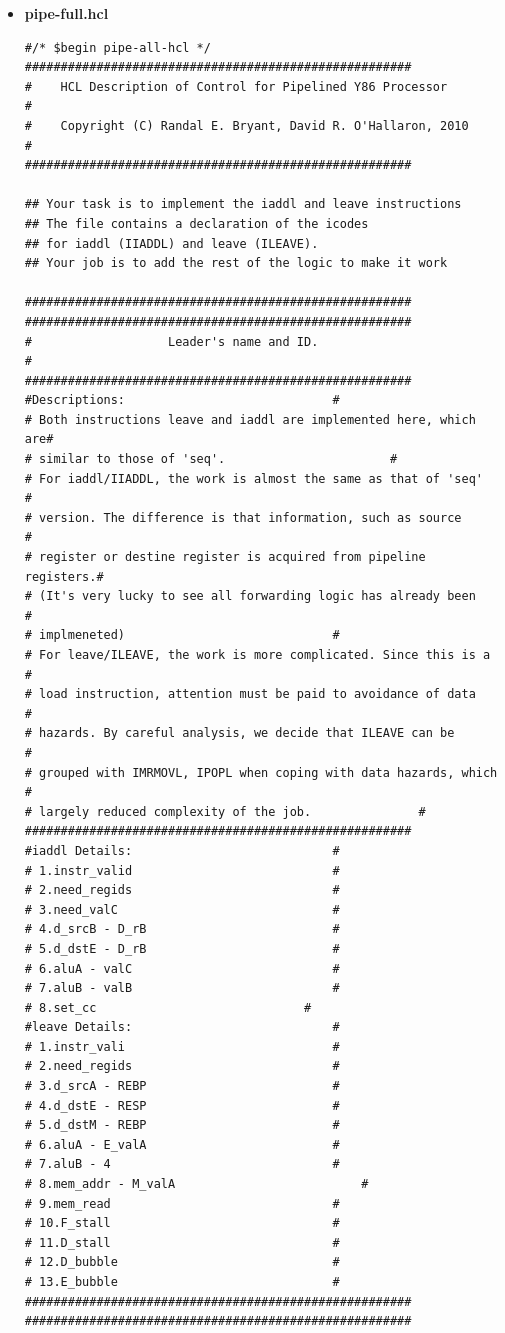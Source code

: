 \documentclass{article}
\begin{document}
\begin{itemize}
\begin{lstlisting}[caption={}]
   \end{lstlisting}


\item \textbf{pipe-full.hcl}
  \begin{lstlisting}[caption={}]
#/* $begin pipe-all-hcl */
######################################################
#    HCL Description of Control for Pipelined Y86 Processor        #
#    Copyright (C) Randal E. Bryant, David R. O'Hallaron, 2010     #
######################################################

## Your task is to implement the iaddl and leave instructions
## The file contains a declaration of the icodes
## for iaddl (IIADDL) and leave (ILEAVE).
## Your job is to add the rest of the logic to make it work

######################################################
######################################################
#                   Leader's name and ID.                          #
######################################################
#Descriptions:							   #
# Both instructions leave and iaddl are implemented here, which are#
# similar to those of 'seq'.					   #
# For iaddl/IIADDL, the work is almost the same as that of 'seq'   #
# version. The difference is that information, such as source	   #
# register or destine register is acquired from pipeline registers.#
# (It's very lucky to see all forwarding logic has already been    #
# implmeneted)							   #
# For leave/ILEAVE, the work is more complicated. Since this is a  #
# load instruction, attention must be paid to avoidance of data    #
# hazards. By careful analysis, we decide that ILEAVE can be 	   #
# grouped with IMRMOVL, IPOPL when coping with data hazards, which #
# largely reduced complexity of the job.			   #
######################################################
#iaddl Details:							   #
# 1.instr_valid							   #
# 2.need_regids							   #
# 3.need_valC							   #
# 4.d_srcB - D_rB						   #
# 5.d_dstE - D_rB						   #
# 6.aluA - valC							   #
# 7.aluB - valB							   #
# 8.set_cc							   #
#leave Details:							   # 
# 1.instr_vali							   #
# 2.need_regids							   #
# 3.d_srcA - REBP						   #
# 4.d_dstE - RESP						   #
# 5.d_dstM - REBP						   #
# 6.aluA - E_valA						   #
# 7.aluB - 4							   #
# 8.mem_addr - M_valA						   #
# 9.mem_read							   #
# 10.F_stall							   #
# 11.D_stall							   #
# 12.D_bubble							   #
# 13.E_bubble							   #
######################################################
######################################################


\end{lstlisting}
\end{itemize}
\end{document}
